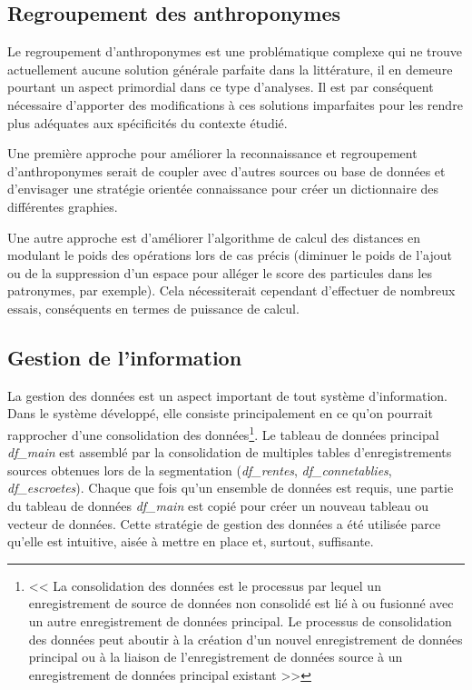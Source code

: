\subsection{Regroupement des anthroponymes}
Le regroupement d'anthroponymes est une problématique complexe qui ne trouve actuellement aucune solution générale parfaite dans la littérature, il en demeure  pourtant un aspect primordial dans ce type  d'analyses. Il est par conséquent nécessaire d'apporter des modifications à ces solutions imparfaites pour les rendre plus adéquates aux spécificités du contexte étudié.

Une première approche pour améliorer la reconnaissance et regroupement d'anthroponymes serait de coupler avec d'autres sources ou base de données et d'envisager une stratégie orientée connaissance pour créer un  dictionnaire des différentes graphies.

Une autre approche est d'améliorer l'algorithme de calcul des distances en modulant le poids des opérations lors de cas précis (diminuer le poids de l'ajout ou de la suppression d'un espace pour alléger le score des particules dans les patronymes, par exemple). Cela nécessiterait cependant d'effectuer de nombreux essais, conséquents en termes de puissance de calcul.

\subsection{Gestion de l'information}
La gestion des données est un aspect important de tout système d'information.
Dans le système développé, elle consiste principalement en ce qu'on pourrait rapprocher d'une consolidation des données\footnote{<< La consolidation des données est le processus par lequel un enregistrement de source de données non consolidé est lié à ou fusionné avec un autre enregistrement de données principal. Le processus de consolidation des données peut aboutir à la création d'un nouvel enregistrement de données principal ou à la liaison de l'enregistrement de données source à un enregistrement de données principal existant >> }. Le tableau de données principal \textit{df\_main} est assemblé par la consolidation de multiples tables d'enregistrements sources obtenues lors de la segmentation (\textit{df\_rentes}, \textit{df\_connetablies}, \textit{df\_escroetes}). Chaque que fois qu'un ensemble de données est requis, une partie du tableau de données \textit{df\_main} est copié pour créer un nouveau tableau ou vecteur de données. Cette stratégie de gestion des données  a été utilisée parce qu'elle est intuitive, aisée à mettre en place et, surtout, suffisante.

